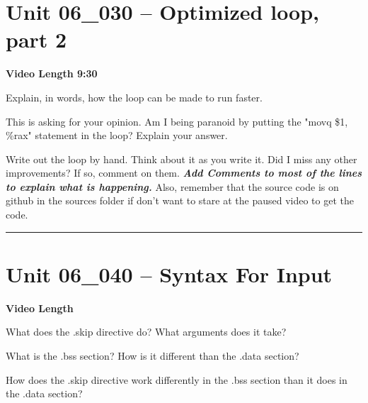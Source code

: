 \documentclass[letterpaper,12pt]{exam}
\newcommand{\unit}{Unit 06}
\begin{document}
\begin{questions}
\section*{\unit\_030 -- Optimized loop, part 2}
\par{\selectfont\textbf{Video Length 9:30}}
\begin{samepage}
    \question Explain, in words, how the loop can be made to run faster.
    \vspace{35mm}
\end{samepage}
\par
\begin{samepage}
    \question This is asking for your opinion.  Am I being paranoid by putting the "movq \$1, \%rax" statement in the loop?  Explain your answer.
    \vspace{25mm}
\end{samepage}
\par
 \begin{samepage}
     \question Write out the loop by hand.  Think about it as you write it.  Did I miss any other improvements?  If so, comment on them. \textbf{\textit{Add Comments to most of the lines to explain what is happening.}}  Also, remember that the source code is on github in the sources folder if don't want to stare at the paused video to get the code.
     \vspace{75mm}
 \end{samepage}
 \par
  
\rule{0.5\textwidth}{.4pt} %
\section*{\unit\_040 -- Syntax For Input}
\par{\selectfont\textbf{Video Length }}
\begin{samepage}
    \question What does the .skip directive do?  What arguments does it take?
    \vspace{5mm}
\end{samepage}
\par
\begin{samepage}
    \question What is the .bss section?  How is it different than the .data section?
    \vspace{5mm}
\end{samepage}
\par
 \begin{samepage}
     \question How does the .skip directive work differently in the .bss section than it does in the .data section?
     \vspace{5mm}
 \end{samepage}
 \par
  

\end{questions}
\end{document}
